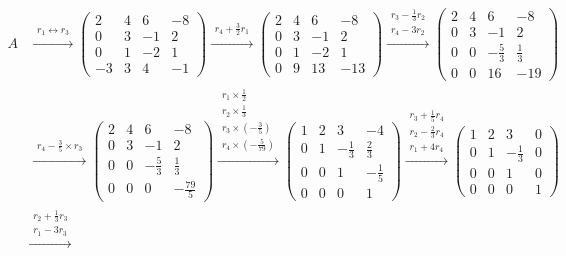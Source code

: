 \documentclass[a4paper]{report}
\begin{document}
\begin{jie}
\begin{align*}
A&\xrightarrow{\substack{r_{1}\leftrightarrow r_{3}}}
{
\begin{pmatrix}
2&4&6&-8\\
0&3&-1&2\\
0&1&-2&1\\
-3&3&4&-1
\end{pmatrix}
}\xrightarrow{\substack{r_{4}+\frac{3}{2} r_{1}}}
{
\begin{pmatrix}
2&4&6&-8\\
0&3&-1&2\\
0&1&-2&1\\
0&9&13&-13
\end{pmatrix}
}\xrightarrow{\substack{r_{3}-\frac{1}{3} r_{2} \\ r_{4}-3r_{2}}}
{
\begin{pmatrix}
2&4&6&-8\\
0&3&-1&2\\
0&0&-\frac{5}{3}&\frac{1}{3}\\
0&0&16&-19
\end{pmatrix}
}\\ &\xrightarrow{\substack{r_{4}-\frac{3}{5}\times r_{3}}}
{
\begin{pmatrix}
2&4&6&-8\\
0&3&-1&2\\
0&0&-\frac{5}{3}&\frac{1}{3}\\
0&0&0&-\frac{79}{5}
\end{pmatrix}
}\xrightarrow{\substack{r_{1}\times\frac{1}{2}\\ r_{2}\times\frac{1}{3}\\ r_{3}\times\left(-\frac{3}{5}\right)\\ r_{4}\times\left(-\frac{5}{79}\right)}}
{
\begin{pmatrix}
1&2&3&-4\\
0&1&-\frac{1}{3}&\frac{2}{3}\\
0&0&1&-\frac{1}{5}\\
0&0&0&1
\end{pmatrix}
}\xrightarrow{\substack{r_{3}+\frac{1}{5}r_{4}\\ r_{2}-\frac{2}{3}r_{4}\\ r_{1}+4r_{4}}}
{
\begin{pmatrix}
1&2&3&0\\
0&1&-\frac{1}{3}&0\\
0&0&1&0\\
0&0&0&1
\end{pmatrix}
}\\ &\xrightarrow{\substack{r_{2}+\frac{1}{3}r_{3}\\ r_{1}-3r_{3}}}

\end{align*}
\end{jie}
\end{document}
